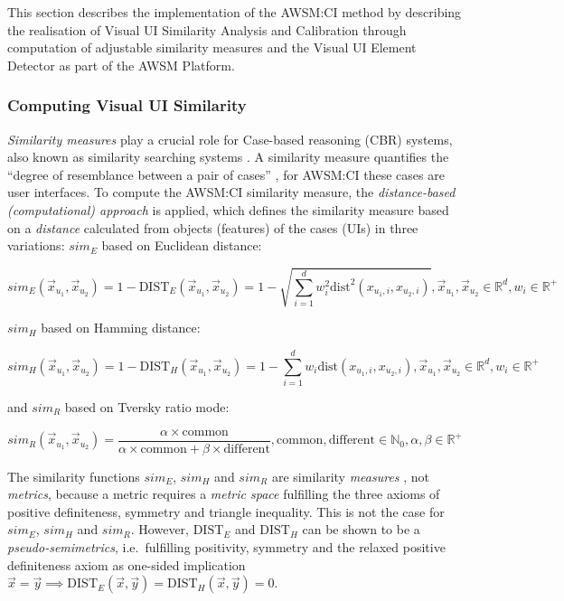 This section describes the implementation of the AWSM:CI method by describing the realisation of Visual UI Similarity Analysis and Calibration through computation of adjustable similarity measures and the Visual UI Element Detector as part of the AWSM Platform.

\hypertarget{sec:computing-sim}{%
\subsubsection{Computing Visual UI Similarity}\label{sec:computing-sim}}

\emph{Similarity measures} play a crucial role for Case-based reasoning (CBR) systems, also known as similarity searching systems \autocite{Liao1998}.
A similarity measure quantifies the ``degree of resemblance between a pair of cases'' \autocite{Liao1998}, for AWSM:CI these cases are user interfaces.
To compute the AWSM:CI similarity measure, the \emph{distance-based (computational) approach} is applied, which defines the similarity measure based on a \emph{distance} calculated from objects (features) of the cases (UIs) \autocite{Liao1998} in three variations: \(sim_E\) based on Euclidean distance:

\begin{equation}sim_E(\vec x_{u_1}, \vec x_{u_2}) = 1- \text{DIST}_E(\vec x_{u_1}, \vec x_{u_2}) = 1 - \sqrt{\sum\limits_{i=1}^{d} w_i^2 \text{dist}^2(x_{u_1,i}, x_{u_2,i})}, \vec x_{u_1}, \vec x_{u_2} \in \mathbb{R}^d, w_i \in \mathbb{R}^+\label{eq:sim_e}\end{equation}

\(sim_H\) based on Hamming distance:

\begin{equation}sim_H(\vec x_{u_1}, \vec x_{u_2}) = 1- \text{DIST}_H(\vec x_{u_1}, \vec x_{u_2}) = 1 - \sum\limits_{i=1}^{d} w_i \text{dist}(x_{u_1,i}, x_{u_2,i}), \vec x_{u_1}, \vec x_{u_2} \in \mathbb{R}^d, w_i \in \mathbb{R}^+\label{eq:sim_h}\end{equation}

and \(sim_R\) based on Tversky ratio mode:

\begin{equation}sim_R(\vec x_{u_1}, \vec x_{u_2}) = \frac{\alpha \times \text{common}}{\alpha \times \text{common} + \beta \times \text{different}}, \text{common},\text{different} \in \mathbb{N}_0, \alpha, \beta \in \mathbb{R}^+ \label{eq:sim_r}\end{equation}

The similarity functions \(sim_E\), \(sim_H\) and \(sim_R\) are similarity \emph{measures} \autocite{ISO/IEEE2017Measurement}, not \emph{metrics}, because a metric requires a \emph{metric space} fulfilling the three axioms of positive definiteness, symmetry and triangle inequality.
This is not the case for \(sim_E\), \(sim_H\) and \(sim_R\).
However, \(\text{DIST}_E\) and \(\text{DIST}_H\) can be shown to be a \emph{pseudo-semimetrics}, i.e.~fulfilling positivity, symmetry and the relaxed positive definiteness axiom as one-sided implication \(\vec x = \vec y \implies \text{DIST}_E(\vec x, \vec y) = \text{DIST}_H(\vec x, \vec y) = 0\).

